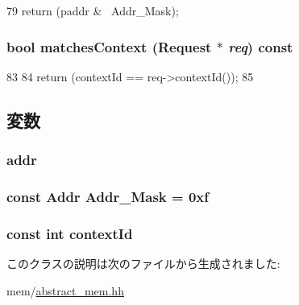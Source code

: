 \begin{DoxyCode}
79 { return (paddr & ~Addr_Mask); }
\end{DoxyCode}
\hypertarget{classLockedAddr_a9c8aa9df464f2067efb9cf2aeeb2a5c0}{
\subsubsection[{matchesContext}]{\setlength{\rightskip}{0pt plus 5cm}bool matchesContext ({\bf Request} $\ast$ {\em req}) const}}
\label{classLockedAddr_a9c8aa9df464f2067efb9cf2aeeb2a5c0}



\begin{DoxyCode}
83     {
84         return (contextId == req->contextId());
85     }
\end{DoxyCode}


\subsection{変数}
\hypertarget{classLockedAddr_a0bb77b4ba61e408313e1118250f9278c}{
\subsubsection[{addr}]{ {\bf addr}}}
\label{classLockedAddr_a0bb77b4ba61e408313e1118250f9278c}
\hypertarget{classLockedAddr_a27195273cc64bf014d6a9273a2eabd78}{
\subsubsection[{Addr\_\-Mask}]{\setlength{\rightskip}{0pt plus 5cm}const {\bf Addr} {\bf Addr\_\-Mask} = 0xf}}
\label{classLockedAddr_a27195273cc64bf014d6a9273a2eabd78}
\hypertarget{classLockedAddr_a4ec643fb866cd5b538447f3a670c1d27}{
\subsubsection[{contextId}]{\setlength{\rightskip}{0pt plus 5cm}const int {\bf contextId}}}
\label{classLockedAddr_a4ec643fb866cd5b538447f3a670c1d27}


このクラスの説明は次のファイルから生成されました:\begin{DoxyCompactItemize}
\item 
mem/\hyperlink{abstract__mem_8hh}{abstract\_\-mem.hh}\end{DoxyCompactItemize}
